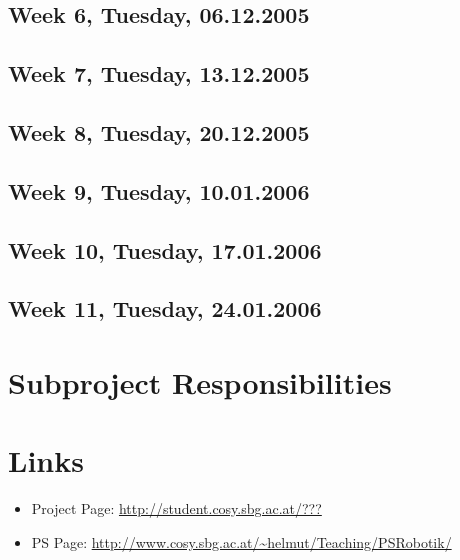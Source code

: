 \documentclass[12pt,fleqn,a4paper]{article}
\begin{document}
\subsection{Week 6, Tuesday, 06.12.2005}

\subsection{Week 7, Tuesday, 13.12.2005}

\subsection{Week 8, Tuesday, 20.12.2005}

\subsection{Week 9, Tuesday, 10.01.2006}

\subsection{Week 10, Tuesday, 17.01.2006}

\subsection{Week 11, Tuesday, 24.01.2006}

\newpage

\section{Subproject Responsibilities} %
\newpage

\section{Links}

\begin{itemize}
\item Project Page: \url{http://student.cosy.sbg.ac.at/???}
\item PS Page:
\url{http://www.cosy.sbg.ac.at/~helmut/Teaching/PSRobotik/}

\end{itemize}

\end{document}
